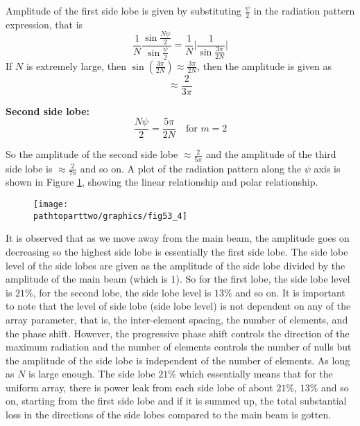 Amplitude of the first side lobe is given by substituting $\frac{\psi}{2}$ in the radiation pattern expression, that is
$$\frac{1}{N} \frac{\sin{\frac{N\psi}{2}}}{\sin{\frac{\psi}{2}}} = \frac{1}{N} |{\frac{1}{\sin{\frac{3\pi}{2N}}} |}   $$
If $N$ is extremely large, then $\sin{(\frac{3\pi}{2N})} \approx  \frac{3\pi}{2N}$, then the amplitude is given as $$\approx \frac{2}{3\pi}$$


\textbf{Second side lobe:}
$$\frac{N\psi}{2} = \frac{5\pi}{2N} \quad \text{for $m=2$} $$

So the amplitude of the second side lobe  $\approx \frac{2}{5\pi}$ and the amplitude of the third side lobe is $\approx \frac{2}{7\pi}$ and so on. A plot of the radiation pattern along the $\psi$ axis is shown in Figure \ref{53.4}, showing the linear relationship and polar relationship.
\begin{figure}[h]
\centering
\texttt{[image: \\pathtoparttwo/graphics/fig53\_4]}
\caption{}
\label{53.4}
\end{figure}

It is observed that as we move away from the main beam,  the amplitude goes on decreasing so the highest side lobe is essentially the first side lobe. The side lobe level of the side lobes are given as the amplitude of the side lobe divided by the amplitude of the main beam (which is $1$). So for the first lobe, the side lobe level is $21\%$, for the second lobe, the side lobe level is $13\%$ and so on. It is important to note that the level of side lobe (side lobe level) is not dependent on any of the array parameter, that is, the inter-element spacing, the number of elements, and the phase shift. However, the progressive phase shift controls the direction of the maximum radiation and the number of elements controls the number of nulls but the amplitude of the side lobe is independent of the number of elements. As long as $N$ is large enough. The side lobe $21\%$ which essentially means that for the uniform array, there is power leak  from each side lobe of about $21\%$, $13\%$ and so on, starting from the first side lobe and if it is summed up, the total substantial loss in the directions of the side lobes compared to the main beam is gotten.